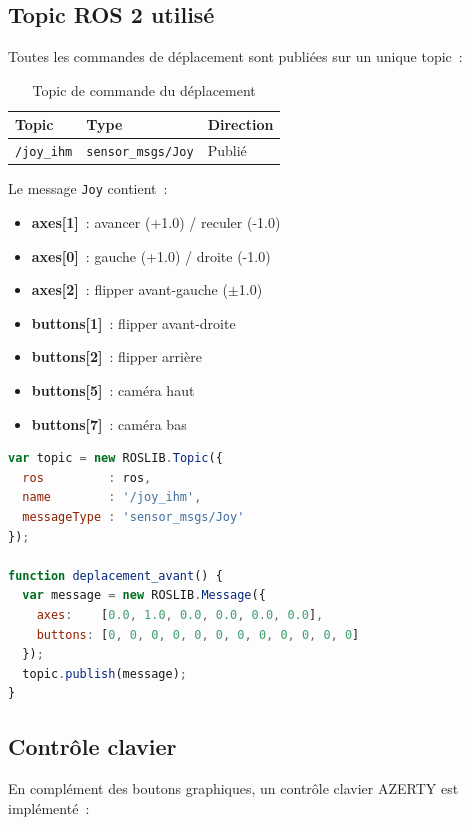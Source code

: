 \documentclass[12pt,a4paper]{report}
\begin{document}
\subsection{Topic ROS 2 utilisé}

Toutes les commandes de déplacement sont publiées sur un unique topic~:

\begin{table}[H]
\centering
\begin{tabularx}{\textwidth}{lll}
\toprule
\textbf{Topic} & \textbf{Type} & \textbf{Direction} \\
\midrule
\texttt{/joy\_ihm} & \texttt{sensor\_msgs/Joy} & Publié \\
\bottomrule
\end{tabularx}
\caption{Topic de commande du déplacement}
\end{table}

Le message \texttt{Joy} contient~:
\begin{itemize}
  \item \textbf{axes[1]}~: avancer (+1.0) / reculer (-1.0)
  \item \textbf{axes[0]}~: gauche (+1.0) / droite (-1.0)
  \item \textbf{axes[2]}~: flipper avant-gauche ($\pm$1.0)
  \item \textbf{buttons[1]}~: flipper avant-droite
  \item \textbf{buttons[2]}~: flipper arrière
  \item \textbf{buttons[5]}~: caméra haut
  \item \textbf{buttons[7]}~: caméra bas
\end{itemize}

\begin{lstlisting}[language=JavaScript, caption={Envoi du message de déplacement avant sur /joy\_ihm}]
var topic = new ROSLIB.Topic({
  ros         : ros,
  name        : '/joy_ihm',
  messageType : 'sensor_msgs/Joy'
});

function deplacement_avant() {
  var message = new ROSLIB.Message({
    axes:    [0.0, 1.0, 0.0, 0.0, 0.0, 0.0],
    buttons: [0, 0, 0, 0, 0, 0, 0, 0, 0, 0, 0, 0]
  });
  topic.publish(message);
}
\end{lstlisting}

\subsection{Contrôle clavier}

En complément des boutons graphiques, un contrôle clavier AZERTY est implémenté~:
\end{document}
